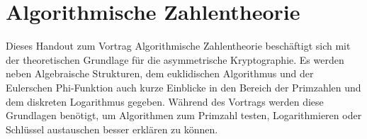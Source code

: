 \chapter*{Algorithmische Zahlentheorie}\label{Algorithmische Zahlentheorie}
	\wup Dieses Handout zum Vortrag Algorithmische Zahlentheorie beschäftigt sich mit der theoretischen Grundlage für die asymmetrische Kryptographie. Es werden neben Algebraische Strukturen, dem euklidischen Algorithmus und der Eulerschen Phi-Funktion auch kurze Einblicke in den Bereich der Primzahlen und dem diskreten Logarithmus gegeben. Während des Vortrags werden diese Grundlagen benötigt, um Algorithmen zum Primzahl testen, Logarithmieren oder Schlüssel austauschen besser erklären zu können.
